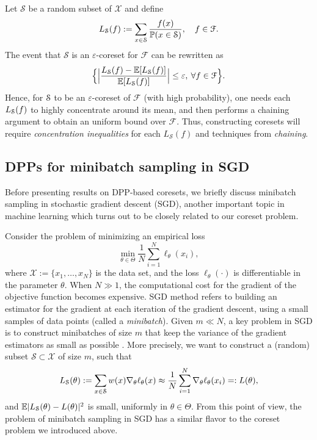 Let $\mathcal S$ be a random subset of $\mathcal X$ and define
\[ L_{\mathcal{S}}(f) := \sum_{x\in \mathcal{S}} \frac{f(x)}{\mathbb P(x\in \mathcal{S})}, \quad f\in \mathcal F.\]
The event that $\mathcal S$ is an $\varepsilon$-coreset for $\mathcal F$ can be rewritten as
\begin{equation} \label{eq:coreset}
    \Big \{ \Big |\frac{L_{\mathcal S}(f) - \mathbb E[L_{\mathcal S}(f)]}{\mathbb E[L_{\mathcal{S}}(f)]} \Big | \le \varepsilon , \: \forall f\in \mathcal F \Big \}.
\end{equation}
Hence, for $\mathcal{S}$ to be an $\varepsilon$-coreset of $\mathcal F$ (with high probability), one needs each $L_{\mathcal{S}}(f)$ to highly concentrate around its mean, and then performs a chaining argument to obtain an uniform bound over $\mathcal F$.  
Thus, constructing coresets will require \textit{concentration inequalities} for each $L_{\mathcal S}(f)$ and techniques from \textit{chaining}.

\subsection{DPPs for minibatch sampling in SGD}
Before presenting results on DPP-based coresets, we briefly discuss minibatch sampling in stochastic gradient descent (SGD), another important topic in machine learning which turns out to be closely related to our coreset problem. 

Consider the problem of minimizing an empirical loss
\[ \min_{\theta \in \Theta} \frac{1}{N} \sum_{i=1}^N \ell_{\theta}(x_i),\]
where $\mathcal X:= \{x_1,\ldots,x_N\}$ is the data set, and the loss $\ell_{\theta}(\cdot)$ is differentiable in the parameter $\theta$. When $N\gg 1$, the computational cost for the gradient of the objective function becomes expensive. SGD method \cite{Robbins_SGD} refers to building an estimator for the gradient at each iteration of the gradient descent, using a small samples of data points (called a \textit{minibatch}). Given $m\ll N$, a key problem in SGD is to construct minibatches of size $m$ that keep the variance of the gradient estimators as small as possible \cite{NIPS2011_SGD, zhang2017_SGD}. More precisely, we want to construct a (random) subset $\mathcal S \subset \mathcal X$ of size $m$, such that
\[ L_{\mathcal{S}}(\theta) := \sum_{x\in \mathcal S} w(x) \nabla_{\theta} \ell_{\theta}(x) \approx \frac{1}{N} \sum_{i=1}^N \nabla_{\theta} \ell_{\theta}(x_i) =: L(\theta),\]
and $\mathbb E|L_{\mathcal{S}}(\theta) - L(\theta)|^2$ is small, uniformly in $\theta\in \Theta$. From this point of view, the problem of minibatch sampling in SGD has a similar flavor to the coreset problem we introduced above.

